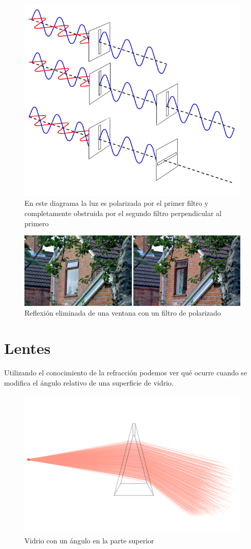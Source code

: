 \documentclass{article}
\begin{document}
\begin{figure}[H]
	\centering
	\includegraphics[width=0.75\linewidth]{Figuras/Polarizador_2}
	\caption{En este diagrama la luz es polarizada por el primer filtro y completamente obstruida por el segundo filtro perpendicular al primero}
	\label{fig:polarizador2}
\end{figure}

\begin{figure}[H]
	\centering
	\includegraphics[width=0.85\linewidth]{Figuras/Brewsters_Window}
	\caption{Reflexión eliminada de una ventana con un filtro de polarizado}
	\label{fig:brewsterswindow}
\end{figure}


\section{Lentes}

Utilizando el conocimiento de la refracción podemos ver qué ocurre cuando se modifica el ángulo relativo de una superficie de vidrio.

\begin{figure}[H]
	\centering
	\includegraphics[width=0.65\linewidth]{Figuras/Lens_1}
	\caption{Vidrio con un ángulo en la parte superior}
	\label{fig:lens1}
\end{figure}
\end{document}
